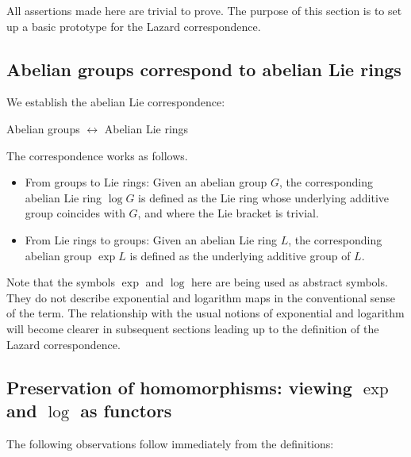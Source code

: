 \documentclass{ucetd}
\begin{document}
All assertions made here are trivial to prove. The purpose of this
section is to set up a basic prototype for the Lazard correspondence.

\subsection{Abelian groups correspond to abelian Lie rings}\label{sec:abelian-lie-correspondence-def}

We establish the abelian Lie correspondence:

\begin{center}
  Abelian groups $\leftrightarrow$ Abelian Lie rings
\end{center}

The correspondence works as follows.

\begin{itemize}
\item From groups to Lie rings: Given an abelian group $G$, the
  corresponding abelian Lie ring $\log G$ is defined as the Lie ring whose
  underlying additive group coincides with $G$, and where the Lie
  bracket is trivial.
\item From Lie rings to groups: Given an abelian Lie ring $L$, the
  corresponding abelian group $\exp L$ is defined as the underlying
  additive group of $L$.
\end{itemize}

Note that the symbols $\exp$ and $\log$ here are being used as
abstract symbols. They do not describe exponential and logarithm
maps in the conventional sense of the term. The relationship with the
usual notions of exponential and logarithm will become clearer in
subsequent sections leading up to the definition of the Lazard
correspondence.

\subsection{Preservation of homomorphisms: viewing $\exp$ and $\log$ as functors}\label{sec:abelian-lie-correspondence-homomorphism-preservation}

The following observations follow immediately from the definitions:
\end{document}
